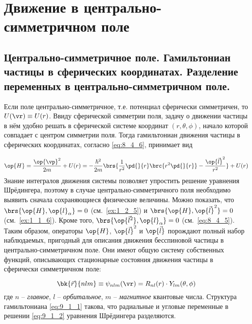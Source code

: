 \chapter{Движение в центрально-симметричном поле}

\begin{sloppypar}
\section{Центрально-симметричное поле. Гамильтониан частицы в сферических координатах. Разделение переменных в центрально-симметричном поле.}
\end{sloppypar}

Если поле центрально-симметричное, т.е. потенциал сферически симметричен, то $U(\vr) \equiv U(r)$. Ввиду сферической симметрии поля, задачу о движении частицы в нём удобно решать в сферической системе координат $(r, \theta, \phi)$, начало которой совпадает с центром симметрии поля. Тогда гамильтониан движения частицы в сферических координатах, согласно \eqref{eq:8_4_6}, принимает вид

\begin{equation}
\label{eq:9_1_1}
\op{H} = \frac{\op{\vp}^2}{2m} + U(r) = - \frac{\hbar^2}{2m} \brs{\frac{1}{r^2} \pd{}{r} \brc{r^2 \pd{}{r}} - \frac{\op{\vec{l}}^2}{r^2}} + U(r)
\end{equation}%
%
Знание интегралов движения системы позволяет упростить решение уравнения Шрёдингера, поэтому в случае центрально-симметричного поля необходимо выявить сначала сохраняющиеся физические величины. Можно показать, что $\brs{\op{H}, \op{l}_\alpha} = 0$ (см.~\cref{ex:1_2_5}) и $\brs{\op{H}, \op{\vec{l}}^2} = 0$ (см.~\cref{ex:1_1_6}). Кроме того, $\brs{\op{\vec{l}^2}, \op{l}_\alpha} = 0$ (см.~\eqref{eq:8_4_5}). Таким образом, операторы $\op{H}$, $\op{\vec{l}}^2$ и $\op{\vec{l}}$ порождают полный набор наблюдаемых, пригодный для описания движения бесспиновой частицы в центрально-симметричном поле. Они имеют общую систему собственных функций, описывающих стационарные состояния движения частицы в сферически симметричном поле:

\begin{equation}
\label{eq:9_1_2}
\bk{\vec{r}}{nlm} \equiv \psi_{nlm}(\vr) = R_{nl}(r) \cdot Y_{lm}(\theta, \phi)
\end{equation}%
%
где $n$ -- {\em главное}, $l$ -- {\em орбитальное}, $m$ -- {\em магнитное} квантовые числа. Структура гамильтониана \eqref{eq:9_1_1} такова, что радиальные и угловые переменные в решении \eqref{eq:9_1_2} уравнения Шрёдингера разделяются.

